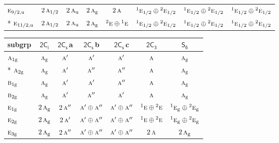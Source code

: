 \documentclass[10pt,a4paper]{article}
\numberwithin{equation}{section}
\newcommand{\grp}[1]{\mathsf{#1}}
\newcommand{\irr}[1]{\text{\normalfont\scshape #1}}
\newcommand{\conjpair}[1]{{}^{#1}}
\newcommand{\ptag}[1]{\mathrm{#1}}
\newcommand{\clsletter}[1]{\,{\scriptsize\color{black!55}#1}}
\begin{document}
{\begin{longtable}{@{}lccccccc@{}}
$\irr{e}_{9/2,\ptag{u}}$ & $2\,\irr{a}_{1/2}$ & $2\,\irr{a}_{\ptag{u}}$ & $2\,\irr{a}_{\ptag{g}}$ & $2\,\irr{a}$ & $\conjpair{1}\irr{e}_{1/2}\oplus \conjpair{2}\irr{e}_{1/2}$ & $\conjpair{1}\irr{e}_{1/2}\oplus \conjpair{2}\irr{e}_{1/2}$ & $\conjpair{1}\irr{e}_{1/2}\oplus \conjpair{2}\irr{e}_{1/2}$\\*
$\irr{e}_{11/2,\ptag{u}}$ & $2\,\irr{a}_{1/2}$ & $2\,\irr{a}_{\ptag{u}}$ & $2\,\irr{a}_{\ptag{g}}$ & $\conjpair{2}\irr{e}\oplus \conjpair{1}\irr{e}$ & $\conjpair{1}\irr{e}_{1/2}\oplus \conjpair{2}\irr{e}_{1/2}$ & $\conjpair{1}\irr{e}_{1/2}\oplus \conjpair{2}\irr{e}_{1/2}$ & $\conjpair{1}\irr{e}_{1/2}\oplus \conjpair{2}\irr{e}_{1/2}$\\
\bottomrule\end{longtable}}
{\small\begin{longtable}{@{}lcccccc@{}}\toprule
subgrp & \href{2S2.pdf}{$\grp{2C_{i}}$} & \href{2C1v.pdf}{$\grp{2C_{s}}$}\clsletter{a} & \href{2C1v.pdf}{$\grp{2C_{s}}$}\clsletter{b} & \href{2C1v.pdf}{$\grp{2C_{s}}$}\clsletter{c} & \href{2C3.pdf}{$\grp{2C_{3}}$} & \href{S6.pdf}{$\grp{S_{6}}$}\\\midrule\endhead
\bottomrule\endfoot\endlastfoot
$\irr{a}_{1\ptag{g}}$ & $\irr{a}_{\ptag{g}}$ & $\irr{a}'$ & $\irr{a}'$ & $\irr{a}'$ & $\irr{a}$ & $\irr{a}_{\ptag{g}}$\\*
$\irr{a}_{2\ptag{g}}$ & $\irr{a}_{\ptag{g}}$ & $\irr{a}'$ & $\irr{a}''$ & $\irr{a}''$ & $\irr{a}$ & $\irr{a}_{\ptag{g}}$\\
$\irr{b}_{1\ptag{g}}$ & $\irr{a}_{\ptag{g}}$ & $\irr{a}'$ & $\irr{a}'$ & $\irr{a}''$ & $\irr{a}$ & $\irr{a}_{\ptag{g}}$\\
$\irr{b}_{2\ptag{g}}$ & $\irr{a}_{\ptag{g}}$ & $\irr{a}'$ & $\irr{a}''$ & $\irr{a}'$ & $\irr{a}$ & $\irr{a}_{\ptag{g}}$\\
$\irr{e}_{1\ptag{g}}$ & $2\,\irr{a}_{\ptag{g}}$ & $2\,\irr{a}''$ & $\irr{a}'\oplus \irr{a}''$ & $\irr{a}'\oplus \irr{a}''$ & $\conjpair{1}\irr{e}\oplus \conjpair{2}\irr{e}$ & $\conjpair{1}\irr{e}_{\ptag{g}}\oplus \conjpair{2}\irr{e}_{\ptag{g}}$\\
$\irr{e}_{2\ptag{g}}$ & $2\,\irr{a}_{\ptag{g}}$ & $2\,\irr{a}'$ & $\irr{a}'\oplus \irr{a}''$ & $\irr{a}'\oplus \irr{a}''$ & $\conjpair{1}\irr{e}\oplus \conjpair{2}\irr{e}$ & $\conjpair{1}\irr{e}_{\ptag{g}}\oplus \conjpair{2}\irr{e}_{\ptag{g}}$\\
$\irr{e}_{3\ptag{g}}$ & $2\,\irr{a}_{\ptag{g}}$ & $2\,\irr{a}''$ & $\irr{a}'\oplus \irr{a}''$ & $\irr{a}'\oplus \irr{a}''$ & $2\,\irr{a}$ & $2\,\irr{a}_{\ptag{g}}$\\

\end{longtable}}
\end{document}
